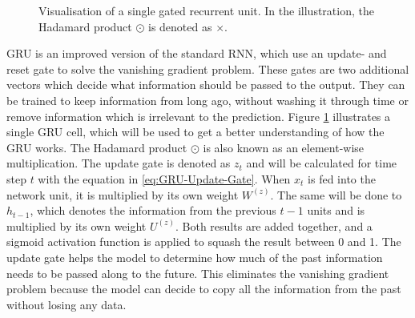 \begin{figure}[htbp]
    \caption{Visualisation of a single gated recurrent unit. In the illustration, the Hadamard product $\odot$ is denoted as $\times$.}
    \label{fig:GRU-Visualisation}
\end{figure}
\noindent
\gls{GRU} is an improved version of the standard \gls{RNN}, which use an update- and reset gate to solve the vanishing gradient problem. These gates are two additional vectors which decide what information should be passed to the output. They can be trained to keep information from long ago, without washing it through time or remove information which is irrelevant to the prediction. Figure \ref{fig:GRU-Visualisation} illustrates a single \gls{GRU} cell, which will be used to get a better understanding of how the \gls{GRU} works. The Hadamard product $\odot$ is also known as an element-wise multiplication.
\newline
\newline
The update gate is denoted as $z_t$ and will be calculated for time step $t$ with the equation in \ref{eq:GRU-Update-Gate}. When $x_t$ is fed into the network unit, it is multiplied by its own weight $W^{(z)}$. The same will be done to $h_{t-1}$, which denotes the information from the previous $t-1$ units and is multiplied by its own weight $U^{(z)}$. Both results are added together, and a sigmoid activation function is applied to squash the result between 0 and 1. The update gate helps the model to determine how much of the past information needs to be passed along to the future. This eliminates the vanishing gradient problem because the model can decide to copy all the information from the past without losing any data.
